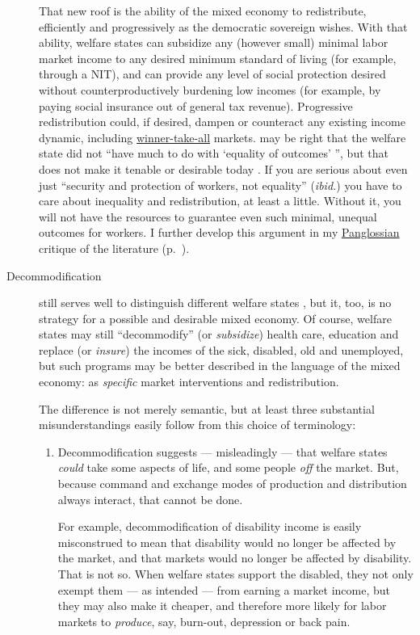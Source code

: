 \begin{description}
	That new roof is the ability of the mixed economy to redistribute, efficiently and progressively as the democratic sovereign wishes.
	With that ability, welfare states can subsidize any (however small) minimal labor market income to any desired minimum standard of living (for example, through a \gls{NIT}), and can provide any level of social protection desired without counterproductively burdening low incomes (for example, by paying social insurance out of general tax revenue).
	Progressive redistribution could, if desired, dampen or counteract any existing income dynamic, including \hyperref[sec:winner-take-all]{winner-take-all} markets.
	\citeauthor{Offe2003} may be right that the welfare state did not ``have much to do with `equality of outcomes' '', but that does not make it tenable or desirable today \citeyearpar[450]{Offe2003}.
	If you are serious about even just ``security and protection of workers, not equality'' (\emph{ibid.}) you have to care about inequality and redistribution, at least a little.
	Without it, you will not have the resources to guarantee even such minimal, unequal outcomes for workers.
	I further develop this argument  in my \hyperref[sec:Pangloss]{Panglossian} critique of the literature (p.~\pageref{sec:Pangloss}).

	\item[Decommodification]
	still serves well to distinguish different welfare states \citep{Esping-Andersen-1990-aa}, but it, too, is no strategy for a possible and desirable mixed economy.
	Of course, welfare states may still ``decommodify'' (or \emph{subsidize}) health care, education and replace (or \emph{insure}) the incomes of the sick, disabled, old and unemployed, but such programs may be better described in the language of the mixed economy:
	as \emph{specific} market interventions and redistribution.

	The difference is not merely semantic, but at least three substantial misunderstandings easily follow from this choice of terminology:
	\begin{enumerate}
		\item Decommodification suggests --- misleadingly --- that welfare states \emph{could} take some aspects of life, and some people \emph{off} the market.
		But, because command and exchange modes of production and distribution always interact, that cannot be done.

		For example, decommodification of disability income is easily misconstrued to mean that disability would no longer be affected by the market, and that markets would no longer be affected by disability.
		That is not so.
		When welfare states support the disabled, they not only exempt them --- as intended --- from earning a market income, but they may also make it cheaper, and therefore more likely for labor markets to \emph{produce}, say, burn-out, depression or back pain.


\end{enumerate}
\end{description}

